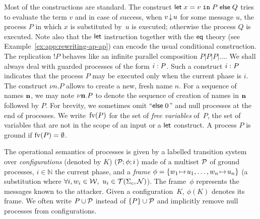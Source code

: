 Most of the constructions are standard.
The construct  $\mathsf{let} \; x = v \;\mathtt{in} \;P \; \mathsf{else} \; Q$
tries to evaluate the term $v$ and in case of success, 
\ie when $v \!\downarrow\! u$ for some message $u$, the process $P$ 
in which $x$ is substituted by~$u$ is executed;
otherwise the process $Q$ is executed.
Note also that the $\mathsf{let}$ instruction together with the
$\mathsf{eq}$ theory (see Example~\ref{ex:app:rewriting-ap-ap}) can encode the usual
conditional construction.
The replication $!P$ behaves like an infinite parallel composition
$P|P|P|\ldots$.
We shall always deal with guarded processes of the form $i: P$.
Such a construct $i: P$ indicates that the process
$P$ may be executed only when the current phase is $i$.
%
%
The construct $\nu n.P$ allows to create a new, fresh name $n$.
For a sequence of names ${\mathbf{n}}$, we may note $\nu{\mathbf{n}}.P$
to denote the sequence of creation of names in ${\mathbf{n}}$ followed by $P$.
For brevity, we sometimes omit ``$\mathsf{else}\;0$''
and null processes at the end of processes.
We write~$\mathrm{fv}(P)$ for %
the set of \emph{free variables} of~$P$, \ie the set
of variables that are not in the scope of an input or a $\mathsf{let}$
construct.
A process $P$ is ground if $\mathrm{fv}(P) = \emptyset$.



The operational semantics of processes is given by a labelled transition
system over \emph{configurations} (denoted by $K$) $(\mathcal{P};\phi;i$)
made of a multiset $\mathcal{P}$ of ground processes,
$i\in\mathbb{N}$ the current phase, and
a {\em frame} $\phi = \{w_1 \!\mapsto\! u_1, \ldots, w_n \!\mapsto\! u_n\}$
(\ie a substitution where $\forall i, w_i\in\mathcal{W},\ u_i\in\mathcal{T}(\Sigma_c,\mathcal{N})$).
The frame~$\phi$ represents the messages known to the attacker.
Given a configuration~$K$, $\phi(K)$ denotes its frame.
We often write $P \cup \mathcal{P}$  instead of $\{P\} \cup \mathcal{P}$
and implicitly remove null processes from configurations.

\renewcommand{\key}{\mathsf{key}}

